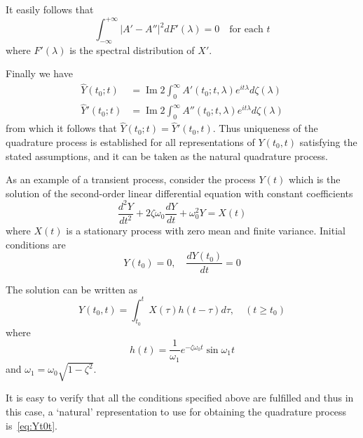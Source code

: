 \documentclass{article}
\begin{document}
It easily follows that
\begin{equation}
\int_{-\infty}^{+\infty} |A' - A''|^2 dF'(\lambda) = 0 \quad \text{for each } t
\label{eq:AAdiff}
\end{equation}
where $F'(\lambda)$ is the spectral distribution of $X'$.

Finally we have
\begin{align}
\hat{Y}(t_0; t) &= \operatorname{Im} 2 \int_0^{\infty} A'(t_0; t, \lambda) e^{i t \lambda} d\zeta(\lambda) \label{eq:YhatA} \\
\hat{Y}'(t_0; t) &= \operatorname{Im} 2 \int_0^{\infty} A''(t_0; t, \lambda) e^{i t \lambda} d\zeta(\lambda) \label{eq:YhatAprime}
\end{align}
from which it follows that $\hat{Y}(t_0; t) = \hat{Y}'(t_0, t)$. Thus uniqueness of the quadrature process is established for all representations of $Y(t_0, t)$ satisfying the stated assumptions, and it can be taken as the natural quadrature process.

As an example of a transient process, consider the process $Y(t)$ which is the solution of the second-order linear differential equation with constant coefficients
\begin{equation}
\frac{d^2 Y}{dt^2} + 2 \zeta \omega_0 \frac{dY}{dt} + \omega_0^2 Y = X(t)
\label{eq:ODE}
\end{equation}
where $X(t)$ is a stationary process with zero mean and finite variance. Initial conditions are
\begin{equation}
Y(t_0) = 0, \quad \frac{dY(t_0)}{dt} = 0
\label{eq:ODEinit}
\end{equation}

The solution can be written as
\begin{equation}
Y(t_0, t) = \int_{t_0}^t X(\tau) h(t - \tau) d\tau, \quad (t \geq t_0)
\label{eq:ODEsol}
\end{equation}
where
\begin{equation}
h(t) = \frac{1}{\omega_1} e^{-\zeta \omega_0 t} \sin \omega_1 t
\label{eq:ODEh}
\end{equation}
and $\omega_1 = \omega_0 \sqrt{1 - \zeta^2}$.

It is easy to verify that all the conditions specified above are fulfilled and thus in this case, a `natural' representation to use for obtaining the quadrature process is~\eqref{eq:Yt0t}.
\end{document}
